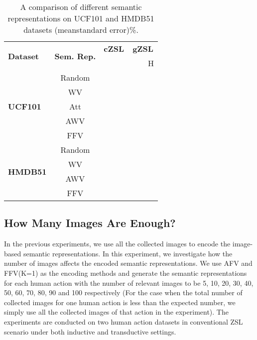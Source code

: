 \documentclass[runningheads,a4paper] {llncs}
\begin{document}
\begin{table*}[t]
{\normalsize
\centering
\caption[]{A comparison of different semantic representations  on UCF101 and HMDB51 datasets (meanstandard error)\%.
}
\label{table_comparison}

\begin{lrbox}{\tablebox}
\begin{tabular}{@{}lc|c|ccc}\toprule
  \multirow{2}{*}{\textbf{Dataset}} & \multirow{2}{*}{\textbf{Sem. Rep.}} & \multicolumn{1}{c|}{\textbf{cZSL}} & \multicolumn{3}{c}{\textbf{gZSL} }\\
  \cmidrule(l){3-6}
  & & \textbf{} & \textbf{} & \textbf{} & {H}  \\ \midrule
  
\multirow{5}{*}{\textbf{UCF101}}& Random  & 		   &           &           &  \\
& WV 	 &  &  &  &  \\
& Att &  &  &  &  \\
& AWV &  &  &  &  \\
& FFV &  &  &  &  \\
\midrule

\multirow{4}{*}{\textbf{HMDB51}}& Random  & 		   &           &           &  \\
& WV 	 &  &  &  &  \\
& AWV &  &  &  &  \\
& FFV &  &  &  &  \\
\bottomrule
\end{tabular}
\end{lrbox}
\scalebox{0.8}{\usebox{\tablebox}}
}
\end{table*}

\subsection{How Many Images Are Enough?}
\label{sect_noImgs}
In the previous experiments, we use all the collected images to encode the image-based semantic representations. In this experiment, we investigate how the number of images affects the encoded semantic representations. We use AFV and FFV(K=1) as the encoding methods and generate the semantic representations for each human action with the number of relevant images to be 5, 10, 20, 30, 40, 50, 60, 70, 80, 90 and 100 respectively (For the case when the total number of collected images for one human action is less than the expected number, we simply use all the collected images of that action in the experiment). The experiments are conducted on two human action datasets in conventional ZSL scenario under both inductive and transductive settings.
\end{document}
